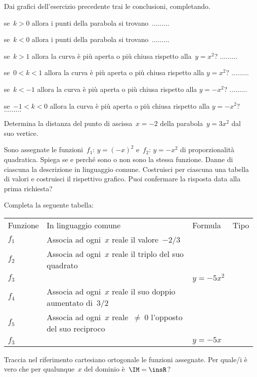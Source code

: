 \begin{esercizio}
\label{ese:D.54}
Dai grafici dell'esercizio precedente trai le conclusioni, completando.
\begin{enumeratea}
\item se~\(k>0\) allora i punti della parabola si trovano~\(\ldots \ldots \ldots\)
\item se~\(k<0\) allora i punti della parabola si trovano~\(\ldots \ldots \ldots\)
\item se~\(k>1\) allora la curva è più aperta o più chiusa rispetto 
alla~\(y=x^{2}\)? \(\ldots \ldots \ldots\)
\item se~\(0<k<1\) allora la curva è più aperta o più chiusa rispetto alla  
\(y=x^{2}\)? \(\ldots \ldots \ldots\)
\item se~\(k<-1\) allora la curva è più aperta o più chiusa rispetto alla  
\(y=-x^{2}\)? \(\ldots \ldots \ldots\)
\item se~\(-1<k<0\) allora la curva è più aperta o più chiusa rispetto alla  
\(y=-x^{2}\)? \(\ldots \ldots \ldots\)
\end{enumeratea}
\end{esercizio}

\begin{esercizio}
\label{ese:D.55}
Determina la distanza del punto di ascissa~\(x=-2\) della parabola~\(y=3x^{2}\) dal 
suo vertice.
\end{esercizio}

\begin{esercizio}
\label{ese:D.56}
Sono assegnate le funzioni~\(f_{1}:\, y=(-x)^{2}\) e~\(f_{2}:\, y=-x^{2}\) di 
proporzionalità quadratica.
Spiega se e perché sono o non sono la stessa funzione.
Danne di ciascuna la descrizione in linguaggio comune.
Costruisci per ciascuna una tabella di valori e costruisci il rispettivo 
grafico.
Puoi confermare la risposta data alla prima richiesta?
\end{esercizio}

\begin{esercizio}
\label{ese:D.57}
Completa la seguente tabella:
\begin{center}
 \begin{tabular}{llll}
  \toprule
  Funzione&In linguaggio comune&Formula&Tipo\\
  \(f_1\)&Associa ad ogni~\(x\) reale il valore~\(-2/3\)& &\\
  \(f_2\)&Associa ad ogni~\(x\) reale il triplo del suo quadrato& & \\
  \(f_3\)& &\(y=-5x^2\)& \\
  \(f_4\)&Associa ad ogni~\(x\) reale il suo doppio aumentato di~\(3/2\)& & \\
  \(f_5\)&Associa ad ogni~\(x\) reale~\(\neq~0\) l'opposto del suo reciproco& & \\
  \(f_3\)& &\(y=-5x\)& \\
  \bottomrule
 \end{tabular}
\end{center}
Traccia nel riferimento cartesiano ortogonale le funzioni assegnate. Per quale/i 
è vero che per qualunque~\(x\) del dominio è~\(\IM=\insR\)?
\end{esercizio}


